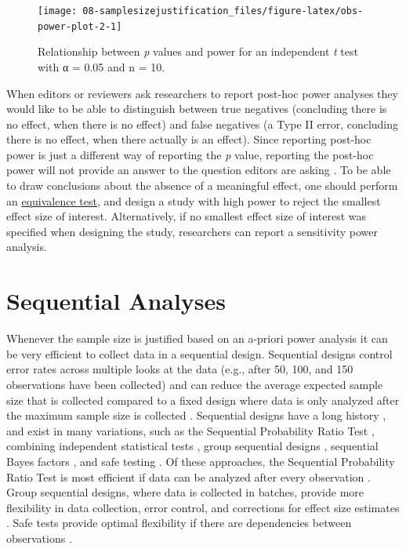 \documentclass[
  oneside]{krantz}
\begin{document}
\begin{figure}

{\centering \texttt{[image: 08-samplesizejustification\_files/figure-latex/obs-power-plot-2-1]} 

}

\caption{Relationship between \emph{p} values and power for an independent \emph{t} test with α = 0.05 and n = 10.}\label{fig:obs-power-plot-2}
\end{figure}

When editors or reviewers ask researchers to report post-hoc power analyses they would like to be able to distinguish between true negatives (concluding there is no effect, when there is no effect) and false negatives (a Type II error, concluding there is no effect, when there actually is an effect). Since reporting post-hoc power is just a different way of reporting the \emph{p} value, reporting the post-hoc power will not provide an answer to the question editors are asking \citep{hoenig_abuse_2001, lenth_post_2007, yuan_post_2005, schulz_sample_2005}. To be able to draw conclusions about the absence of a meaningful effect, one should perform an \protect\hyperlink{equivalencetest}{equivalence test}, and design a study with high power to reject the smallest effect size of interest. Alternatively, if no smallest effect size of interest was specified when designing the study, researchers can report a sensitivity power analysis.

\hypertarget{sequentialsamplesize}{%
\section{Sequential Analyses}\label{sequentialsamplesize}}

Whenever the sample size is justified based on an a-priori power analysis it can be very efficient to collect data in a sequential design. Sequential designs control error rates across multiple looks at the data (e.g., after 50, 100, and 150 observations have been collected) and can reduce the average expected sample size that is collected compared to a fixed design where data is only analyzed after the maximum sample size is collected \citep{wassmer_group_2016, proschan_statistical_2006}. Sequential designs have a long history \citep{dodge_method_1929}, and exist in many variations, such as the Sequential Probability Ratio Test \citep{wald_sequential_1945}, combining independent statistical tests \citep{westberg_combining_1985}, group sequential designs \citep{jennison_group_2000}, sequential Bayes factors \citep{schonbrodt_sequential_2017}, and safe testing \citep{grunwald_safe_2019}. Of these approaches, the Sequential Probability Ratio Test is most efficient if data can be analyzed after every observation \citep{schnuerch_controlling_2020}. Group sequential designs, where data is collected in batches, provide more flexibility in data collection, error control, and corrections for effect size estimates \citep{wassmer_group_2016}. Safe tests provide optimal flexibility if there are dependencies between observations \citep{ter_schure_accumulation_2019}.
\end{document}
